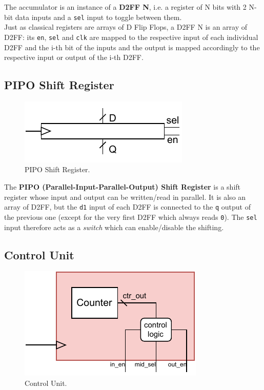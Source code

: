 The accumulator is an instance of a \textbf{D2FF N}, i.e. a register of N bits with 2 N-bit data inputs and a \texttt{sel} input to toggle between them.\\
Just as classical registers are arrays of D Flip Flops, a D2FF N is an array of D2FF: its \texttt{en}, \texttt{sel} and \texttt{clk} are mapped to the respective input of each individual D2FF and the i-th bit of the inputs and the output is mapped accordingly to the respective input or output of the i-th D2FF.

\subsection{PIPO Shift Register}\label{subsec:PIPOshiftreg}

\begin{figure}[H]
    \begin{center}
        \includegraphics[scale=1.3,clip]{img/PIPO_shiftreg_block.pdf}
    \end{center}
    \vspace*{-0.5cm}
    \caption{PIPO Shift Register.}
    \label{fig:PIPOshiftregblock}
\end{figure}
The \textbf{PIPO (Parallel-Input-Parallel-Output) Shift Register} is a shift register whose input and output can be written/read in parallel. It is also an array of D2FF, but the \texttt{d1} input of each D2FF is connected to the \texttt{q} output of the previous one (except for the very first D2FF which always reads \texttt{0}). The \texttt{sel} input therefore acts as a \textit{switch} which can enable/disable the shifting.

\subsection{Control Unit}\label{subsec:CU}
\begin{figure}[H]
    \begin{center}
        \includegraphics[scale=1.3,clip]{img/CU_block.pdf}
    \end{center}
    \vspace*{-0.5cm}
    \caption{Control Unit.}
    \label{fig:CUblock}
\end{figure}

